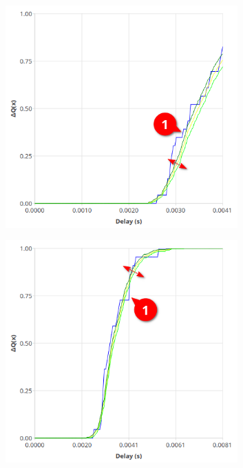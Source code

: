 \begin{figure}[H]
            \centering
            \begin{subfigure}{.5\textwidth}
                \centering
                \includegraphics[width=0.98\textwidth]{img/overload_2/worker_1a.png}
                \label{fig:w14}
            \end{subfigure}%
            \begin{subfigure}{.5\textwidth}
                \centering
                \includegraphics[width =0.98\textwidth]{img/overload_2/worker_1_8a.png}

\end{subfigure}
\end{figure}
